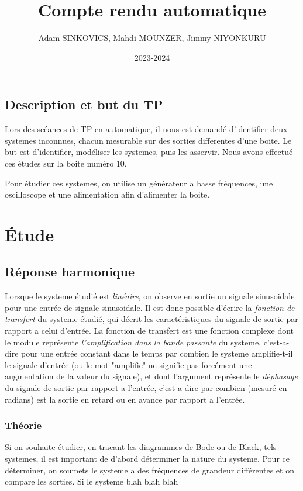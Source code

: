 \documentclass[12pt, a4paper]{report}
\title{Compte rendu automatique}
\author{Adam SINKOVICS, Mahdi MOUNZER, Jimmy NIYONKURU}
\date{2023-2024}
\begin{document}
\maketitle
\pagebreak

\section*{Description et but du TP}

Lors des scéances de TP en automatique, il nous est demandé d'identifier
deux systemes inconnues, chacun mesurable sur des sorties differentes
d'une boite.
Le but est d'identifier, modéliser les systemes, puis les asservir. Nous avons
effectué ces études sur la boite numéro 10.\par
Pour étudier ces systemes, on utilise un générateur a basse fréquences,
une oscilloscope et une alimentation afin d'alimenter la boite.
\nopagebreak

\chapter{Étude}

\section{Réponse harmonique}

Lorsque le systeme étudié est \textit{linéaire}, on observe en sortie un signale sinusoidale 
pour une entrée de signale sinusoidale. Il est donc possible d'écrire la \textit{fonction de transfert}
du systeme étudié, qui décrit les caractéristiques du signale de sortie par rapport
a celui d'entrée. La fonction de transfert est une fonction complexe dont le module
représente \textit{l'amplification dans la bande passante} du systeme, c'est-a-dire pour une entrée constant dans le temps
par combien le systeme amplifie-t-il le signale d'entrée (ou le mot "amplifie" ne signifie pas
forcément une augmentation de la valeur du signale), et dont l'argument représente le \textit{déphasage} du signale
de sortie par rapport a l'entrée, c'est a dire par combien (mesuré en radians) est la sortie en retard
ou en avance par rapport a l'entrée.

\subsection{Théorie}

Si on souhaite étudier, en tracant les diagrammes de Bode ou de Black, tels
systemes, il est important de d'abord déterminer la nature du systeme. Pour ce 
déterminer, on soumets le systeme a des fréquences de grandeur différentes et on
compare les sorties. Si le systeme blah blah blah
\end{document}
